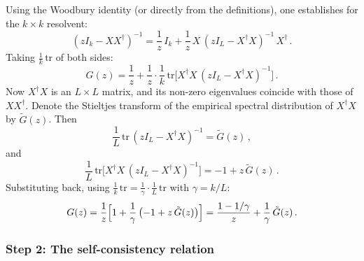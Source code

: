 \documentclass[11pt,letterpaper]{article}
\theoremstyle{plain}
\theoremstyle{definition}
\theoremstyle{remark}
\begin{document}
Using the Woodbury identity (or directly from the definitions), one establishes
for the $k \times k$ resolvent:
\begin{equation}
  (zI_k - XX^{\dagger})^{-1}
  = \frac{1}{z}\,I_k
  + \frac{1}{z}\,X\,(zI_L - X^{\dagger}X)^{-1}\,X^{\dagger}\,.
  \label{eq16:woodbury}
\end{equation}
Taking $\frac{1}{k}\,\mathrm{tr}$ of both sides:
\begin{equation}
  G(z) = \frac{1}{z} + \frac{1}{z}\cdot\frac{1}{k}\,
  \mathrm{tr}\bigl[X^{\dagger}X\,(zI_L - X^{\dagger}X)^{-1}\bigr]\,.
  \label{eq16:trace_identity}
\end{equation}
Now $X^{\dagger}X$ is an $L \times L$ matrix, and its non-zero eigenvalues
coincide with those of $XX^{\dagger}$.  Denote the Stieltjes transform of the
empirical spectral distribution of $X^{\dagger}X$ by $\tilde{G}(z)$.  Then
\begin{equation}
  \frac{1}{L}\,\mathrm{tr}\,(zI_L - X^{\dagger}X)^{-1} = \tilde{G}(z)\,,
  \label{eq16:tildeG_def}
\end{equation}
and
\begin{equation}
  \frac{1}{L}\,\mathrm{tr}\bigl[X^{\dagger}X\,(zI_L - X^{\dagger}X)^{-1}\bigr]
  = -1 + z\,\tilde{G}(z)\,.
  \label{eq16:trace_manipulation}
\end{equation}
Substituting back, using $\frac{1}{k}\,\mathrm{tr} =
\frac{1}{\gamma}\cdot\frac{1}{L}\,\mathrm{tr}$ with $\gamma = k/L$:
\begin{equation}
  G(z) = \frac{1}{z}\Bigl[1 + \frac{1}{\gamma}\,
  \bigl(-1 + z\,\tilde{G}(z)\bigr)\Bigr]
  = \frac{1 - 1/\gamma}{z} + \frac{1}{\gamma}\,\tilde{G}(z)\,.
  \label{eq16:G_tildeG_relation}
\end{equation}

\subsubsection{Step 2: The self-consistency relation}
\end{document}

